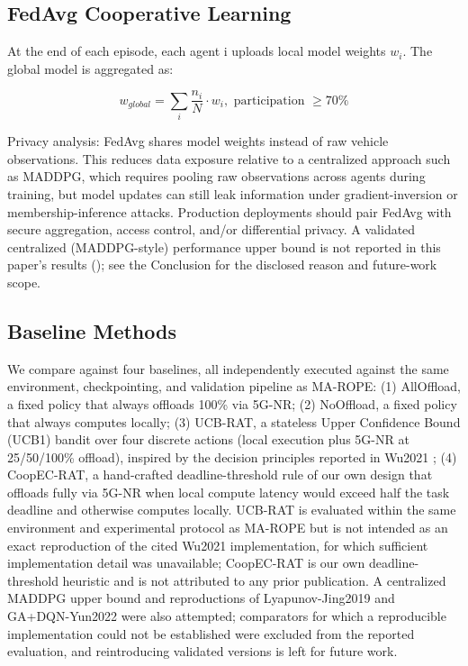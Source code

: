 \documentclass[journal,10pt,twocolumn]{IEEEtran}
\begin{document}
\subsection{FedAvg Cooperative Learning}

At the end of each episode, each agent i uploads local model weights $w_i$. The global model is aggregated as:

\begin{equation}
\label{eq:fedavg}
w_{global} = \sum_i \frac{n_i}{N} \cdot w_i, \text{ participation } \geq 70\%
\end{equation}

Privacy analysis: FedAvg shares model weights instead of raw vehicle observations. This reduces data exposure relative to a centralized approach such as MADDPG, which requires pooling raw observations across agents during training, but model updates can still leak information under gradient-inversion or membership-inference attacks. Production deployments should pair FedAvg with secure aggregation, access control, and/or differential privacy. A validated centralized (MADDPG-style) performance upper bound is not reported in this paper's results (); see the Conclusion for the disclosed reason and future-work scope.




\subsection{Baseline Methods}

We compare against four baselines, all independently executed against the same environment, checkpointing, and validation pipeline as MA-ROPE: (1) AllOffload, a fixed policy that always offloads 100\% via 5G-NR; (2) NoOffload, a fixed policy that always computes locally; (3) UCB-RAT, a stateless Upper Confidence Bound (UCB1) bandit over four discrete actions (local execution plus 5G-NR at 25/50/100\% offload), inspired by the decision principles reported in Wu2021 \cite{wu2021}; (4) CoopEC-RAT, a hand-crafted deadline-threshold rule of our own design that offloads fully via 5G-NR when local compute latency would exceed half the task deadline and otherwise computes locally. UCB-RAT is evaluated within the same environment and experimental protocol as MA-ROPE but is not intended as an exact reproduction of the cited Wu2021 implementation, for which sufficient implementation detail was unavailable; CoopEC-RAT is our own deadline-threshold heuristic and is not attributed to any prior publication. A centralized MADDPG \cite{lowe2017} upper bound and reproductions of Lyapunov-Jing2019 \cite{jing2019} and GA+DQN-Yun2022 \cite{yun2022} were also attempted; comparators for which a reproducible implementation could not be established were excluded from the reported evaluation, and reintroducing validated versions is left for future work.
\end{document}
